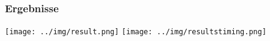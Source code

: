\begin{frame}
  \frametitle{Ergebnisse}
  \begin{center}
  \texttt{[image: ../img/result.png]}
  \qquad
  \texttt{[image: ../img/resultstiming.png]}
  \end{center}
\end{frame}

